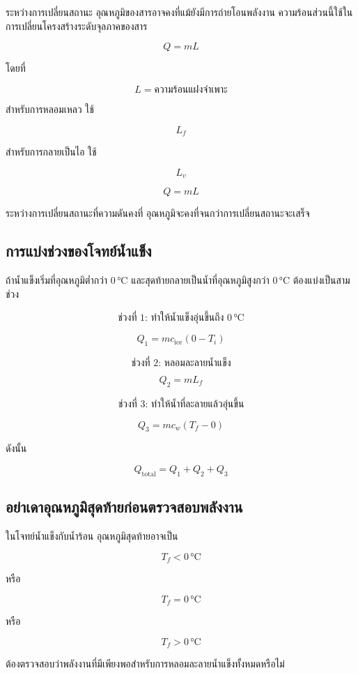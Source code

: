 ระหว่างการเปลี่ยนสถานะ อุณหภูมิของสารอาจคงที่แม้ยังมีการถ่ายโอนพลังงาน ความร้อนส่วนนี้ใช้ในการเปลี่ยนโครงสร้างระดับจุลภาคของสาร

\[
Q=mL
\]

โดยที่

\[
L=\text{ความร้อนแฝงจำเพาะ}
\]

สำหรับการหลอมเหลว ใช้

\[
L_f
\]

สำหรับการกลายเป็นไอ ใช้

\[
L_v
\]

\begin{tcolorbox}[title=ความร้อนแฝง]
\[
\boxed{Q=mL}
\]

ระหว่างการเปลี่ยนสถานะที่ความดันคงที่ อุณหภูมิจะคงที่จนกว่าการเปลี่ยนสถานะจะเสร็จ
\end{tcolorbox}

\subsection{การแบ่งช่วงของโจทย์น้ำแข็ง}

ถ้าน้ำแข็งเริ่มที่อุณหภูมิต่ำกว่า $0\,\si{\degreeCelsius}$ และสุดท้ายกลายเป็นน้ำที่อุณหภูมิสูงกว่า $0\,\si{\degreeCelsius}$ ต้องแบ่งเป็นสามช่วง

\[
\text{ช่วงที่ 1: ทำให้น้ำแข็งอุ่นขึ้นถึง }0\,\si{\degreeCelsius}
\]

\[
Q_1=m c_{\text{ice}}(0-T_i)
\]

\[
\text{ช่วงที่ 2: หลอมละลายน้ำแข็ง}
\]

\[
Q_2=mL_f
\]

\[
\text{ช่วงที่ 3: ทำให้น้ำที่ละลายแล้วอุ่นขึ้น}
\]

\[
Q_3=m c_w(T_f-0)
\]

ดังนั้น

\[
Q_{\text{total}}=Q_1+Q_2+Q_3
\]

\subsection{อย่าเดาอุณหภูมิสุดท้ายก่อนตรวจสอบพลังงาน}

ในโจทย์น้ำแข็งกับน้ำร้อน อุณหภูมิสุดท้ายอาจเป็น

\[
T_f<0\,\si{\degreeCelsius}
\]

หรือ

\[
T_f=0\,\si{\degreeCelsius}
\]

หรือ

\[
T_f>0\,\si{\degreeCelsius}
\]

ต้องตรวจสอบว่าพลังงานที่มีเพียงพอสำหรับการหลอมละลายน้ำแข็งทั้งหมดหรือไม่

